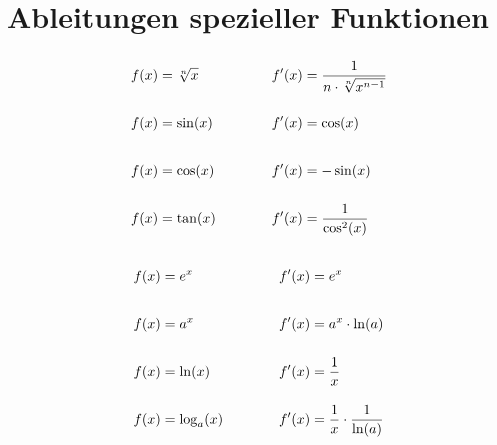 \documentclass
[
  draft    = true,
  fontsize = 11pt,
  parskip  = half-,
  BCOR     = 0pt,
  DIV      = 11,
  ngerman,
  dvipsnames
]
{scrartcl}
\begin{document}
\section*{Ableitungen spezieller Funktionen}
\begin{minipage}[t]{0.49\linewidth}
  \newcommand{\separator}{\quad&\text{\rule[-3ex]{0pt}{7ex}}\quad}
  \vspace*{-\abovedisplayskip}%
  \begin{alignat*}{3}
    f(x)&=\sqrt[n]{x} & \separator & f'(x)&=\frac{1}{n\cdot\sqrt[n]{x^{n-1}}} \\
    f(x)&=\sin(x)     & \separator & f'(x)&=\cos(x)                           \\
    f(x)&=\cos(x)     & \separator & f'(x)&=-\sin(x)                          \\
    f(x)&=\tan(x)     & \separator & f'(x)&=\frac{1}{\cos^{2}(x)}             \\
  \end{alignat*}
\end{minipage}%
\hfill
\begin{minipage}[t]{0.49\linewidth}
  \newcommand{\separator}{\quad&\text{\rule[-3ex]{0pt}{7ex}}\quad}
  \vspace*{-\abovedisplayskip}%
  \begin{alignat*}{3}
    f(x)&=e^{x}       & \separator & f'(x)&=e^{x}                             \\
    f(x)&=a^{x}       & \separator & f'(x)&=a^{x}\cdot\ln(a)                  \\
    f(x)&=\ln(x)      & \separator & f'(x)&=\frac{1}{x}                       \\
    f(x)&=\log_{a}(x) & \separator & f'(x)&=\frac{1}{x}\cdot\frac{1}{\ln(a)}
  \end{alignat*}
\end{minipage}

\clearpage
\end{document}
